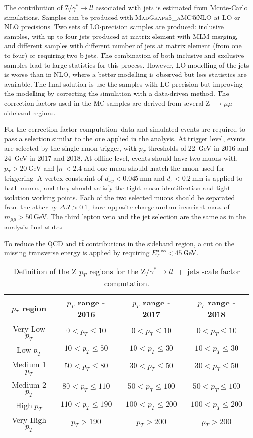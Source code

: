 \documentclass[../main.tex]{subfiles}
\begin{document}
The contribution of Z/$\gamma^*\to ll$ associated with jets is estimated from Monte-Carlo simulations. Samples can be produced with \textsc{MadGraph5\_aMC@NLO} at LO or NLO precisions. Two sets of LO-precision samples are produced: inclusive samples, with up to four jets produced at matrix element with MLM merging, and different samples with different number of jets at matrix element (from one to four) or requiring two b jets. The combination of both inclusive and exclusive samples lead to large statistics for this process. However, LO modelling of the jets is worse than in NLO, where a better modelling is observed but less statistics are available. The final solution is use the samples with LO precision but improving the modelling by correcting the simulation with a data-driven method. The correction factors used in the MC samples are derived from several Z~$\to\mu\mu$ sideband regions.

For the correction factor computation, data and simulated events are required to pass a selection similar to the one applied in the analysis. At trigger level, events are selected by the single-muon trigger, with $p_T$ thresholds of 22~GeV in 2016 and 24~GeV in 2017 and 2018. At offline level, events should have two muons with $p_T > 20~$GeV and $|\eta|<2.4$ and one muon should match the muon used for triggering. A vertex constraint of $d_{xy} < 0.045~$mm and $d_z < 0.2~$mm is applied to both muons, and they should satisfy the tight muon identification and tight isolation working points. Each of the two selected muons should be separated from the other by $\Delta R>0.1$, have opposite charge and an invariant mass of $m_{\mu\mu}>50~$GeV. The third lepton veto and the jet selection are the same as in the analysis final states.

To reduce the QCD and t$\bar{\text{t}}$ contributions in the sideband region, a cut on the missing transverse energy is applied by requiring $E_T^{\text{miss}} < 45~$GeV.


\begin{table}[b!]
\begin{center}
\begin{tabular}{c | c | c | c}
$p_T$ region & $p_T$ range - 2016 & $p_T$ range - 2017 & $p_T$
range - 2018 \\\hline
Very Low $p_T$  & $0<p_T\leq 10$    & $0<p_T\leq 10$    & $0<p_T\leq 10$     \\
Low $p_T$       & $10<p_T\leq 50$   & $10<p_T\leq 30$   & $10<p_T\leq 30$    \\
Medium 1 $p_T$  & $50<p_T\leq 80$   & $30<p_T\leq 50$   & $30<p_T\leq 50$    \\
Medium 2 $p_T$  & $80<p_T\leq 110$  & $50<p_T\leq 100$  & $50<p_T\leq 100$    \\
High $p_T$      & $110<p_T\leq 190$ & $100<p_T\leq 200$ & $100<p_T\leq 200$  \\
Very High $p_T$ & $p_T> 190$        & $p_T> 200$        & $p_T> 200$       
\end{tabular}
\caption[Z/$\gamma^*\to ll$~+~jets scale factor $p_T$ regions]{Definition of the Z $p_T$ regions for the Z/$\gamma^*\to ll$~+~jets scale factor computation.}
\label{hh:tab:dy_sf}
\end{center}
\end{table}
\end{document}
